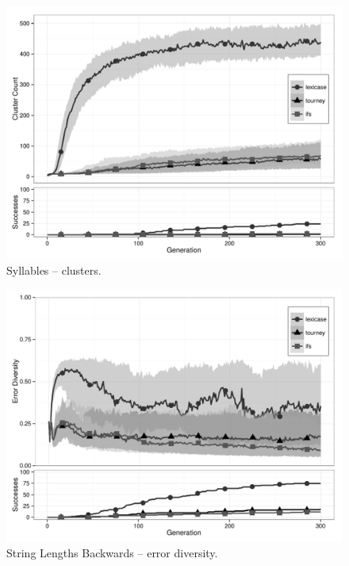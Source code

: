 \begin{figure}[p] %
\centering
\includegraphics[width=11.5cm]{syllables-cluster.pdf}
\caption{Syllables -- clusters.}
\label{syllablesClu}
\end{figure}

\begin{figure}[p] %
\centering
\includegraphics[width=11.5cm]{string-lengths-backwards-diversity.pdf}
\caption{String Lengths Backwards -- error diversity.}
\label{string-lengths-backwardsDiv}
\end{figure}

